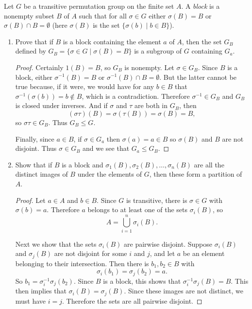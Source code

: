 \label{exercise:group-action:blocks-and-prim}
Let $G$ be a transitive permutation group on the finite set $A$. A
{\em block} is a nonempty subset $B$ of $A$ such that for all
$\sigma\in G$ either $\sigma(B) = B$ or $\sigma(B)\cap B = \emptyset$
(here $\sigma(B)$ is the set $\{\sigma(b)\mid b\in B\}$).
\begin{enumerate}
\item Prove that if $B$ is a block containing the element $a$ of $A$,
  then the set $G_B$ defined by
  $G_B = \{\sigma\in G\mid \sigma(B) = B\}$ is a subgroup of $G$
  containing $G_a$.
  \begin{proof}
    Certainly $1(B) = B$, so $G_B$ is nonempty. Let $\sigma\in
    G_B$. Since $B$ is a block, either $\sigma^{-1}(B) = B$ or
    $\sigma^{-1}(B)\cap B = \emptyset$. But the latter cannot be true
    because, if it were, we would have for any $b\in B$ that
    $\sigma^{-1}(\sigma(b)) = b\not\in B$, which is a
    contradiction. Therefore $\sigma^{-1}\in G_B$ and $G_B$ is closed
    under inverses. And if $\sigma$ and $\tau$ are both in $G_B$, then
    \begin{equation*}
      (\sigma\tau)(B) = \sigma(\tau(B)) = \sigma(B) = B,
    \end{equation*}
    so $\sigma\tau\in G_B$. Thus $G_B\leq G$.

    Finally, since $a\in B$, if $\sigma\in G_a$ then
    $\sigma(a) = a\in B$ so $\sigma(B)$ and $B$ are not disjoint. Thus
    $\sigma\in G_B$ and we see that $G_a\leq G_B$.
  \end{proof}

\item Show that if $B$ is a block and
  $\sigma_1(B), \sigma_2(B), \dots, \sigma_n(B)$ are all the distinct
  images of $B$ under the elements of $G$, then these form a partition
  of $A$.
  \begin{proof}
    Let $a\in A$ and $b\in B$. Since $G$ is transitive, there is
    $\sigma\in G$ with $\sigma(b) = a$. Therefore $a$ belongs to at
    least one of the sets $\sigma_i(B)$, so
    \begin{equation*}
      A = \bigcup_{i=1}^n\sigma_i(B).
    \end{equation*}

    Next we show that the sets $\sigma_i(B)$ are pairwise
    disjoint. Suppose $\sigma_i(B)$ and $\sigma_j(B)$ are not disjoint
    for some $i$ and $j$, and let $a$ be an element belonging to their
    intersection. Then there is $b_1,b_2\in B$ with
    \begin{equation*}
      \sigma_i(b_1) = \sigma_j(b_2) = a.
    \end{equation*}
    So $b_1 = \sigma_i^{-1}\sigma_j(b_2)$. Since $B$ is a block, this
    shows that $\sigma_i^{-1}\sigma_j(B) = B$. This then implies that
    $\sigma_i(B) = \sigma_j(B)$. Since these images are not distinct,
    we must have $i = j$. Therefore the sets are all pairwise
    disjoint.


\end{proof}
\end{enumerate}
